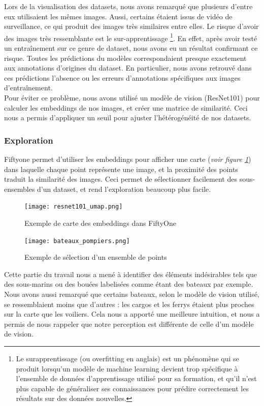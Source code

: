 Lors de la visualisation des datasets, nous avons remarqué que plusieurs d'entre eux utilisaient les
mêmes images. Aussi, certains étaient issus de vidéo de surveillance, ce qui produit des images
très similaires entre elles. Le risque d'avoir des images très ressemblante est le sur-apprentissage
\footnote{Le surapprentissage (ou overfitting en anglais) est un phénomène qui se produit
lorsqu'un modèle de machine learning devient trop spécifique à l'ensemble de données d'apprentissage
utilisé pour sa formation, et qu'il n'est plus capable de généraliser ses connaissances
pour prédire correctement les résultats sur des données nouvelles.}. 
En effet, après avoir testé un entraînement sur ce genre de dataset, nous avons eu un résultat confirmant ce risque. Toutes les prédictions du modèles correspondaient presque exactement aux annotations d'origines du dataset. En particulier, nous avons retrouvé dans ces prédictions l'absence ou les erreurs d'annotations spécifiques aux images d'entraînement.\\


Pour éviter ce problème, nous avons utilisé un modèle de vision (ResNet101) pour calculer les embeddings de nos images,
et créer une matrice de similarité. Ceci nous a permis d'appliquer un seuil pour ajuster l'hétérogénéité
de nos datasets.

\subsubsection{Exploration}

Fiftyone permet d'utiliser les embeddings pour afficher une carte (\textit{voir figure \ref{carte_similarite}})
    dans laquelle chaque point représente
une image, et la proximité des points traduit la similarité des images.
Ceci permet de sélectionner facilement des sous-ensembles d'un dataset, et rend l'exploration beaucoup
plus facile.

\begin{figure}[H]
    \centering
    \texttt{[image: resnet101\_umap.png]}
    \caption{Exemple de carte des embeddings dans FiftyOne}\label{carte_similarite}
\end{figure}

\begin{figure}[H]
    \centering
    \texttt{[image: bateaux\_pompiers.png]}
    \caption{Exemple de sélection d'un ensemble de points}
\end{figure}

Cette partie du travail nous a mené à identifier des éléments indésirables tels que des sous-marins ou
des bouées labelisées comme étant des bateaux par exemple. Nous avons aussi remarqué que certains bateaux,
selon le modèle de vision utilisé, se ressemblaient moins que d'autres : les cargos et les ferrys étaient
plus proches sur la carte que les voiliers. Cela nous a apporté une meilleure intuition, et nous a permis de nous rappeler que notre perception est différente de celle d'un modèle de vision.\\

